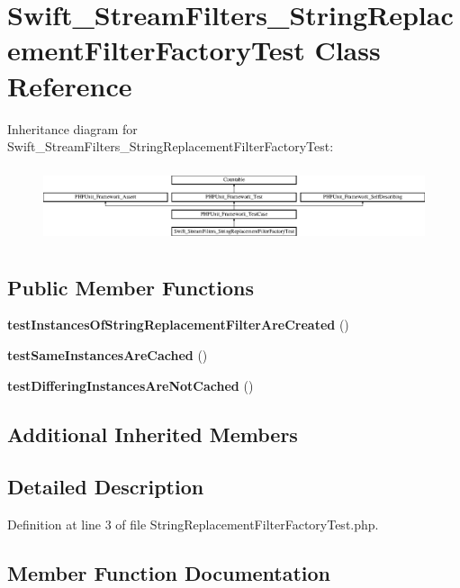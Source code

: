 \section{Swift\+\_\+\+Stream\+Filters\+\_\+\+String\+Replacement\+Filter\+Factory\+Test Class Reference}
\label{class_swift___stream_filters___string_replacement_filter_factory_test}
Inheritance diagram for Swift\+\_\+\+Stream\+Filters\+\_\+\+String\+Replacement\+Filter\+Factory\+Test\+:\begin{figure}[H]
\begin{center}
\leavevmode
\includegraphics[height=2.222222cm]{class_swift___stream_filters___string_replacement_filter_factory_test}
\end{center}
\end{figure}
\subsection*{Public Member Functions}
\begin{DoxyCompactItemize}
\item 
{\bf test\+Instances\+Of\+String\+Replacement\+Filter\+Are\+Created} ()
\item 
{\bf test\+Same\+Instances\+Are\+Cached} ()
\item 
{\bf test\+Differing\+Instances\+Are\+Not\+Cached} ()
\end{DoxyCompactItemize}
\subsection*{Additional Inherited Members}


\subsection{Detailed Description}


Definition at line 3 of file String\+Replacement\+Filter\+Factory\+Test.\+php.



\subsection{Member Function Documentation}
